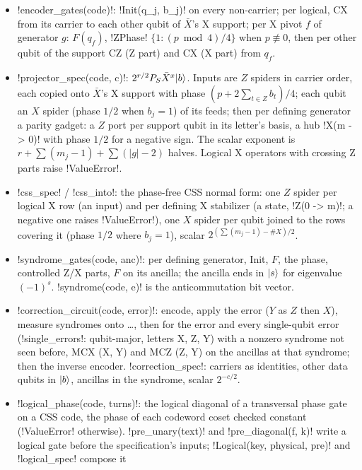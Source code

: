 \begin{itemize}
\item \py!encoder_gates(code)!: \py!Init(q_j, b_j)! on every non-carrier; per logical, CX from
  its carrier to each other qubit of $\bar X$'s X support; per X pivot $f$ of generator $g$:
  $F(q_f)$, \py!ZPhase! $\{1: (p \bmod 4)/4\}$ when $p\not\equiv0$, then per other qubit of the
  support CZ (Z part) and CX (X part) from $q_f$.
\item \py!projector_spec(code, c)!: $2^{r/2}P_S\bar X^x\lvert b \rangle$. Inputs are $Z$ spiders in
  carrier order, each copied onto $\bar X$'s X support with phase $(p + 2\sum_{t\in Z}b_t)/4$;
  each qubit an $X$ spider (phase $1/2$ when $b_j=1$) of its feeds; then per defining generator a
  parity gadget: a $Z$ port per support qubit in its letter's basis, a hub \azx!X(m -> 0)! with
  phase $1/2$ for a negative sign. The scalar exponent is $r + \sum(m_j-1) + \sum(|g|-2)$
  halves. Logical X operators with crossing Z parts raise \py!ValueError!.
\item \py!css_spec! / \py!css_into!: the phase-free CSS normal form: one $Z$ spider per logical
  X row (an input) and per defining X stabilizer (a state, \azx!Z(0 -> m)!; a negative one
  raises \py!ValueError!), one $X$ spider per qubit joined to the rows covering it (phase $1/2$
  where $b_j=1$), scalar $2^{(\sum(m_j-1) - \#X)/2}$.
\item \py!syndrome_gates(code, anc)!: per defining generator, Init, $F$, the phase, controlled
  Z/X parts, $F$ on its ancilla; the ancilla ends in $\lvert s \rangle$ for eigenvalue $(-1)^s$.
  \py!syndrome(code, e)! is the anticommutation bit vector.
\item \py!correction_circuit(code, error)!: encode, apply the error ($Y$ as $Z$ then $X$),
  measure syndromes onto \dots, then for the error and every single-qubit error
  (\py!single_errors!: qubit-major, letters X, Z, Y) with a nonzero syndrome not seen before,
  MCX (X, Y) and MCZ (Z, Y) on the ancillas at that syndrome; then the inverse encoder.
  \py!correction_spec!: carriers as identities, other data qubits in $\lvert b \rangle$, ancillas in the
  syndrome, scalar $2^{-c/2}$.
\item \py!logical_phase(code, turns)!: the logical diagonal of a transversal phase gate on a CSS
  code, the phase of each codeword coset checked constant (\py!ValueError! otherwise).
  \py!pre_unary(text)! and \py!pre_diagonal(f, k)! write a logical gate before the
  specification's inputs; \py!Logical(key, physical, pre)! and \py!logical_spec! compose it

\end{itemize}
